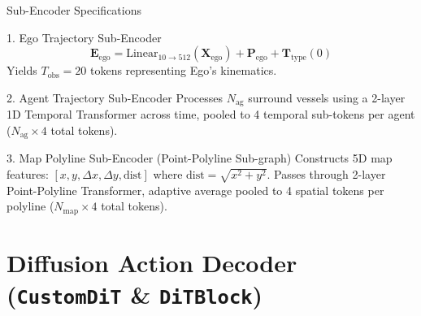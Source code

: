 \documentclass[t]{beamer}
\begin{document}
\begin{frame}{Sub-Encoder Specifications}
    \begin{block}{1. Ego Trajectory Sub-Encoder}
        $$\mathbf{E}_{\text{ego}} = \mathrm{Linear}_{10 \to 512}(\mathbf{X}_{\text{ego}}) + \mathbf{P}_{\text{ego}} + \mathbf{T}_{\text{type}}(0)$$
        Yields $T_{\text{obs}} = 20$ tokens representing Ego's kinematics.
    \end{block}

    \begin{block}{2. Agent Trajectory Sub-Encoder}
        Processes $N_{\text{ag}}$ surround vessels using a 2-layer 1D Temporal Transformer across time, pooled to 4 temporal sub-tokens per agent ($N_{\text{ag}} \times 4$ total tokens).
    \end{block}

    \begin{block}{3. Map Polyline Sub-Encoder (Point-Polyline Sub-graph)}
        Constructs 5D map features: $[x, y, \Delta x, \Delta y, \text{dist}]$ where $\text{dist} = \sqrt{x^2 + y^2}$.
        Passes through 2-layer Point-Polyline Transformer, adaptive average pooled to 4 spatial tokens per polyline ($N_{\text{map}} \times 4$ total tokens).
    \end{block}
\end{frame}

\section{Diffusion Action Decoder (\texttt{CustomDiT} \& \texttt{DiTBlock})}
\end{document}
